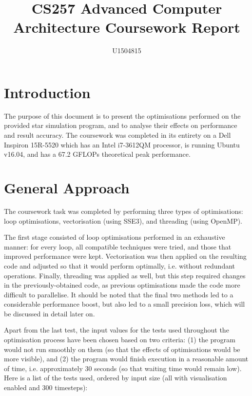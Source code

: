 \documentclass[10pt,a4paper]{article}
\author{U1504815}
\title{CS257 Advanced Computer Architecture Coursework Report}
\begin{document}
\maketitle

\section*{Introduction}

The purpose of this document is to present the optimisations performed on the provided star simulation  program, and to analyse their effects on performance and result accuracy. The coursework was completed in its entirety on a Dell Inspiron 15R-5520 which has an Intel i7-3612QM processor, is running Ubuntu v16.04, and has a 67.2 GFLOPs theoretical peak performance.

\section*{General Approach}

The coursework task was completed by performing three types of optimisations: loop optimisations, vectorisation (using SSE3), and threading (using OpenMP).

The first stage consisted of loop optimisations performed in an exhaustive manner: for every loop, all compatible techniques were tried, and those that improved performance were kept. Vectorisation was then applied on the resulting code and adjusted so that it would perform optimally, i.e. without redundant operations. Finally, threading was applied as well, but this step required changes in the previously-obtained code, as previous optimisations made the code more difficult to parallelise. It should be noted that the final two methods led to a considerable performance boost, but also led to a small precision loss, which will be discussed in detail later on.

Apart from the last test, the input values for the tests used throughout the optimisation process have been chosen based on two criteria: (1) the program would not run smoothly on them (so that the effects of optimisations would be more visible), and (2) the program would finish execution in a reasonable amount of time, i.e. approximately 30 seconds (so that waiting time would remain low). Here is a list of the tests used, ordered by input size (all with visualisation enabled and 300 timesteps): 
\end{document}
